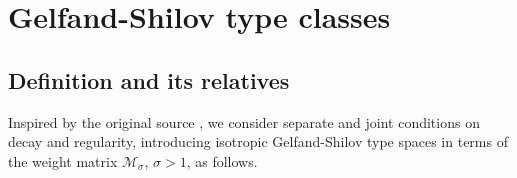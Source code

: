 \documentclass{article}
\theoremstyle{thmstyleone}
\theoremstyle{thmstyletwo}%
\theoremstyle{thmstylethree}%
\begin{document}


\section{Gelfand-Shilov type classes}


\subsection{Definition and its relatives}

Inspired by the original source \cite{GelfandShilov}, we consider separate and joint conditions on decay and regularity, introducing
isotropic Gelfand-Shilov type spaces
in terms of the weight matrix $\mathcal{M}_\sigma$, $ \sigma >1$,
as follows.
\end{document}
